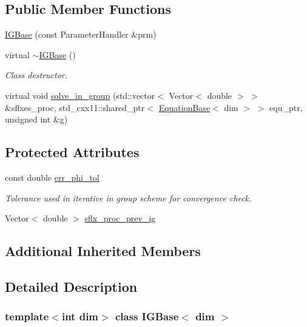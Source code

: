 \subsection*{Public Member Functions}
\begin{DoxyCompactItemize}
\item 
\hyperlink{class_i_g_base_a50fb50b4a31894ddf7957f5bed6d74e7}{I\+G\+Base} (const Parameter\+Handler \&prm)
\item 
virtual \hyperlink{class_i_g_base_abde968ae9031dd55de0193896a0134b9}{$\sim$\+I\+G\+Base} ()
\begin{DoxyCompactList}\small\item\em Class destructor. \end{DoxyCompactList}\item 
virtual void \hyperlink{class_i_g_base_a902e919f8b0283be467261f94f79b2c4}{solve\+\_\+in\+\_\+group} (std\+::vector$<$ Vector$<$ double $>$ $>$ \&sflxes\+\_\+proc, std\+\_\+cxx11\+::shared\+\_\+ptr$<$ \hyperlink{class_equation_base}{Equation\+Base}$<$ dim $>$ $>$ equ\+\_\+ptr, unsigned int \&g)
\end{DoxyCompactItemize}
\subsection*{Protected Attributes}
\begin{DoxyCompactItemize}
\item 
const double \hyperlink{class_i_g_base_ace9461aa2cfc9dcc4455616d2d9d6049}{err\+\_\+phi\+\_\+tol}
\begin{DoxyCompactList}\small\item\em Tolerance used in iterative in group scheme for convergence check. \end{DoxyCompactList}\item 
Vector$<$ double $>$ \hyperlink{class_i_g_base_a0a301d6077cb7c94ab0942ab3d5082a5}{sflx\+\_\+proc\+\_\+prev\+\_\+ig}
\end{DoxyCompactItemize}
\subsection*{Additional Inherited Members}


\subsection{Detailed Description}
\subsubsection*{template$<$int dim$>$\newline
class I\+G\+Base$<$ dim $>$}

